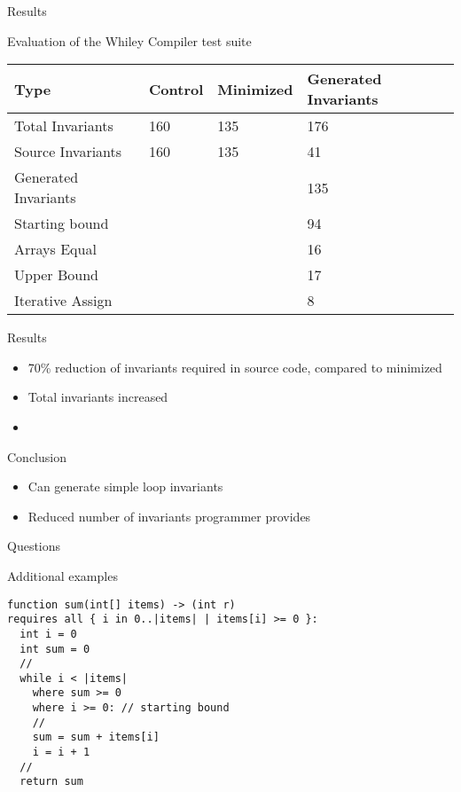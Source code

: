 \begin{frame}{Results}

Evaluation of the Whiley Compiler test suite

\begin{longtable}[]{@{}llll@{}}
\toprule
Type & Control & Minimized & Generated Invariants\tabularnewline
\midrule
\endhead
Total Invariants & 160 & 135 & 176\tabularnewline
Source Invariants & 160 & 135 & 41\tabularnewline
Generated Invariants & & & 135\tabularnewline
Starting bound & & & 94\tabularnewline
Arrays Equal & & & 16\tabularnewline
Upper Bound & & & 17\tabularnewline
Iterative Assign & & & 8\tabularnewline
\bottomrule
\end{longtable}

\end{frame}



\begin{frame}{Results}

\begin{itemize}
\item 70\% reduction of invariants required in source code, compared to
    minimized
\item Total invariants increased
\item 
\end{itemize}

\end{frame}



\begin{frame}{Conclusion}

\begin{itemize}
\item Can generate simple loop invariants
\item Reduced number of invariants programmer provides
\end{itemize}

\end{frame}



\begin{frame}

\begin{center}
    \Huge{Questions}
\end{center}

\end{frame}

\begin{frame}[fragile]{Additional examples}

\begin{verbatim}
function sum(int[] items) -> (int r)
requires all { i in 0..|items| | items[i] >= 0 }:
  int i = 0
  int sum = 0
  //
  while i < |items|
    where sum >= 0
    where i >= 0: // starting bound
    //
    sum = sum + items[i]
    i = i + 1
  //
  return sum
\end{verbatim}

\end{frame}

